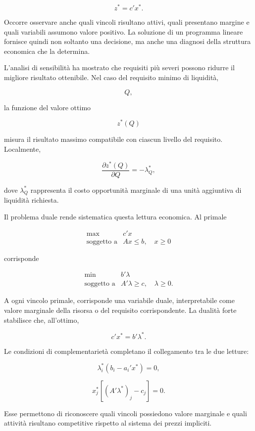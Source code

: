 \[
z^*=c'x^*.
\]

Occorre osservare anche quali vincoli risultano attivi, quali presentano
margine e quali variabili assumono valore positivo. La soluzione di un
programma lineare fornisce quindi non soltanto una decisione, ma anche una
diagnosi della struttura economica che la determina.

L'analisi di sensibilit\`a ha mostrato che requisiti pi\`u severi possono
ridurre il migliore risultato ottenibile. Nel caso del requisito minimo di
liquidit\`a,

\[
Q,
\]

\noindent la funzione del valore ottimo

\[
z^*(Q)
\]

\noindent misura il risultato massimo compatibile con ciascun livello del requisito.
Localmente,

\[
\frac{\partial z^*(Q)}{\partial Q}
=
-\lambda_Q^*,
\]

\noindent dove \(\lambda_Q^*\) rappresenta il costo opportunit\`a marginale di una
unit\`a aggiuntiva di liquidit\`a richiesta.

Il problema duale rende sistematica questa lettura economica. Al primale

\[
\begin{array}{ll}
\max & c'x\\
\mbox{soggetto a} & Ax\leq b,\quad x\geq0
\end{array}
\]

\noindent corrisponde

\[
\begin{array}{ll}
\min & b'\lambda\\
\mbox{soggetto a} & A'\lambda\geq c,\quad \lambda\geq0.
\end{array}
\]

A ogni vincolo primale, corrisponde una variabile duale, interpretabile come
valore marginale della risorsa o del requisito corrispondente. La dualit\`a
forte stabilisce che, all'ottimo,

\[
c'x^*
=
b'\lambda^*.
\]

Le condizioni di complementariet\`a completano il collegamento tra le due
letture:

\[
\lambda_i^*
\left(
b_i-a_i'x^*
\right)
=
0,
\]

\[
x_j^*
\left[
(A'\lambda^*)_j-c_j
\right]
=
0.
\]

Esse permettono di riconoscere quali vincoli possiedono valore marginale e
quali attivit\`a risultano competitive rispetto al sistema dei prezzi
impliciti.

